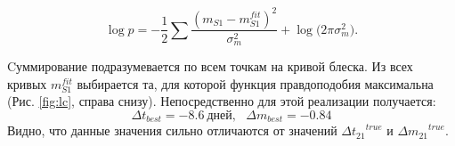 \begin{equation}\label{eq:logprob}
\log p = -\frac{1}{2} \sum \frac{( m_{S1} - m_{S1}^{fit} )^2}{\sigma_m^2} + \log \big( 2\pi\sigma_m^2 \big).
\end{equation}

\noindent Cуммирование подразумевается по всем точкам на кривой блеска. Из всех кривых $m_{S1}^{fit}$ выбирается та, для которой функция правдоподобия максимальна (Рис. \eqref{fig:lc}, справа снизу). Непосредственно для этой реализации получается: $$\Delta t_{best} = -8.6 \ \textrm{дней}, \ \ \ \Delta m_{best} = -0.84$$ Видно, что данные значения сильно отличаются от значений ${\Delta t_{21}}^{true}$ и ${\Delta m_{21}}^{true}$. 







